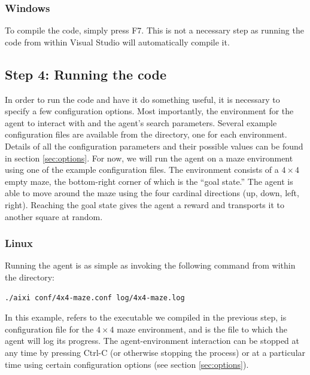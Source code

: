 \documentclass[a4paper,11pt]{article}
\begin{document}
\subsubsection{Windows}
To compile the code, simply press F7. This is not a necessary step as running the code from within Visual Studio will automatically compile it.


\subsection{Step 4: Running the code}


In order to run the code and have it do something useful, it is necessary to specify a few configuration options. Most importantly, the environment for the agent to interact with and the agent's search parameters. Several example configuration files are available from the  directory, one for each environment. Details of all the configuration parameters and their possible values can be found in section \ref{sec:options}. For now, we will run the agent on a maze environment using one of the example configuration files. The environment consists of a $4 \times 4$ empty maze, the bottom-right corner of which is the ``goal state.'' The agent is able to move around the maze using the four cardinal directions (up, down, left, right). Reaching the goal state gives the agent a reward and transports it to another square at random.

\subsubsection{Linux}
Running the agent is as simple as invoking the following command from within the  directory:
\begin{lstlisting}[frame=single]
./aixi conf/4x4-maze.conf log/4x4-maze.log
\end{lstlisting}
In this example,  refers to the executable we compiled in the previous step,  is  configuration file for the $4 \times 4$ maze environment, and  is the file to which the agent will log its progress. The agent-environment interaction can be stopped at any time by pressing Ctrl-C (or otherwise stopping the process) or at a particular time using certain configuration options (see section \ref{sec:options}).
\end{document}
